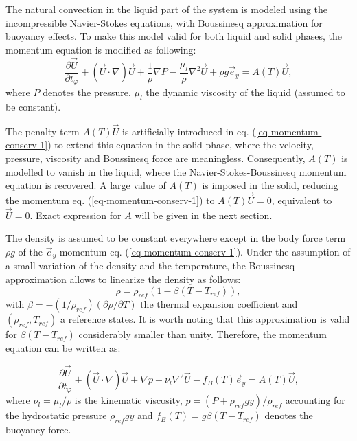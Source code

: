 The natural convection in the liquid part of the system is modeled using the incompressible Navier-Stokes equations, with  Boussinesq approximation for buoyancy effects. To make this model valid for both liquid and solid phases, the momentum equation is modified as following:
\begin{equation}\label{eq-momentum-conserv-1}
\frac{\partial \vec{U}}{\partial t_{\varphi}} +   {(\vec{U}\cdot\nabla ) \vec{U}} + \frac{1}{\rho}\nabla P - \frac{\mu_{l}}{\rho}   {\nabla^2 \vec{U}} 
+ \rho g \vec{e}_y= A(T) \vec{U},
\end{equation}
where $P$ denotes the pressure, $\mu_{l}$ the dynamic viscosity of the liquid (assumed to be constant).  

The penalty term $A(T) \vec{U}$ is artificially introduced in eq. (\ref{eq-momentum-conserv-1}) to extend this equation in the solid phase, where the velocity, pressure, viscosity and Boussinesq force are meaningless.  Consequently, $A(T)$  is modelled to vanish in the liquid, where the Navier-Stokes-Boussinesq momentum equation is recovered. A large value of $A(T)$ is imposed in the solid, reducing the momentum eq. (\ref{eq-momentum-conserv-1})  to $A(T) \vec{U}=0$, equivalent to $\vec{U}=0$. Exact expression for $A$ will be given in the next section.

The density is assumed to be constant everywhere except in the body force term $\rho g$ of the $\vec e_y$ momentum eq. (\ref{eq-momentum-conserv-1}).
Under the assumption of a small variation of the density and the temperature, the Boussinesq approximation allows to linearize the density as follows:
\begin{equation}
   \rho = \rho_{ref} (1 - \beta (T-T_{ref})),
\end{equation}
with $\beta = - (1/\rho_{ref}) (\partial \rho / \partial T)$ the thermal expansion coefficient and $(\rho_{ref},T_{ref})$ a reference states.
It is worth noting that this approximation is valid for $\beta (T - T_{ref})$ considerably smaller than unity.
Therefore, the momentum equation can be written as:

\begin{equation}\label{eq-momentum-conserv}
  \frac{\partial \vec{U}}{\partial t_{\varphi}} +   {(\vec{U}\cdot\nabla ) \vec{U}} + \nabla p - \nu_{l}  {\nabla^2 \vec{U}} 
- f_B(T) \vec{e}_y= A(T) \vec{U},
\end{equation}
where  $\nu_l = \mu_l/\rho$ is the kinematic viscosity,  $p = (P + \rho_{ref} g y)/ \rho_{ref}$ accounting for the hydrostatic pressure $\rho_{ref} g y$ and $f_B(T) = g \beta (T-T_{ref})$ denotes the buoyancy force.

